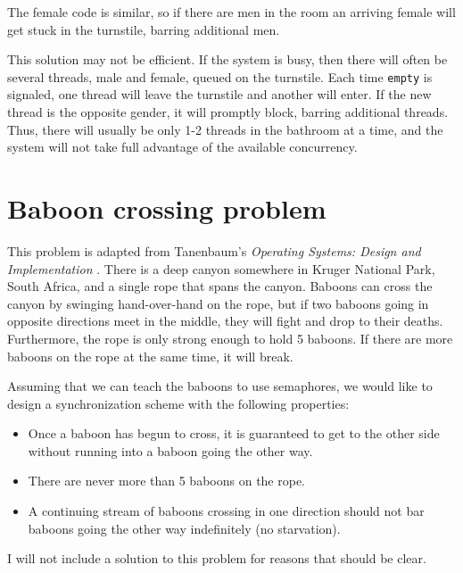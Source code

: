 \documentclass{book}
\begin{document}
The female code is similar, so if there are men in the room an
arriving female will get stuck in the turnstile, barring additional
men.

This solution may not be efficient.  If
the system is busy, then there will often be several threads, male and
female, queued on the turnstile.  Each time {\tt empty} is signaled,
one thread will leave the turnstile and another will enter.  If the
new thread is the opposite gender, it will promptly block, barring
additional threads.  Thus, there will usually be only 1-2 threads in
the bathroom at a time, and the system will not take full advantage
of the available concurrency.


\section{Baboon crossing problem}

This problem is adapted from Tanenbaum's {\em Operating Systems:
Design and Implementation} \cite{tanenbaum}.
There is a deep canyon somewhere in
Kruger National Park, South Africa, and a single rope that spans the
canyon.  Baboons can cross the canyon by swinging hand-over-hand on
the rope, but if two baboons going in opposite directions meet in the
middle, they will fight and drop to their deaths.  Furthermore,
the rope is only strong enough to hold 5 baboons.  If there are
more baboons on the rope at the same time, it will break.

Assuming that we can teach the baboons to use semaphores, we
would like to design a synchronization scheme with the following
properties:

\begin{itemize}

    \item Once a baboon has begun to cross, it is guaranteed
          to get to the other side without running into a baboon going
          the other way.

    \item There are never more than 5 baboons on the rope.

    \item A continuing stream of baboons crossing in one direction
          should not bar baboons going the other way indefinitely
          (no starvation).

\end{itemize}

I will not include a solution to this problem for reasons that
should be clear.
\end{document}
